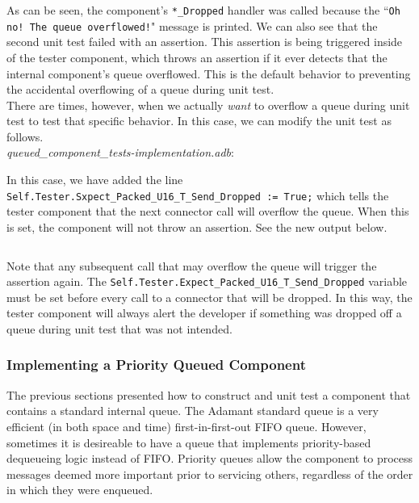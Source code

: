 As can be seen, the component's \texttt{*\_Dropped} handler was called because the ``\texttt{Oh no! The queue overflowed!}" message is printed. We can also see that the second unit test failed with an assertion. This assertion is being triggered inside of the tester component, which throws an assertion if it ever detects that the internal component's queue overflowed. This is the default behavior to preventing the accidental overflowing of a queue during unit test. \\

There are times, however, when we actually \textit{want} to overflow a queue during unit test to test that specific behavior. In this case, we can modify the unit test as follows. \\

\textit{queued\_component\_tests-implementation.adb}:

In this case, we have added the line \texttt{Self.Tester.Sxpect\_Packed\_U16\_T\_Send\_Dropped := True;} which tells the tester component that the next connector call will overflow the queue. When this is set, the component will not throw an assertion. See the new output below.

\vspace{5mm} %
\inputminted{text}{../example_architecture/queued_component/test2/output.txt}
\vspace{5mm} %

Note that any subsequent call that may overflow the queue will trigger the assertion again. The \texttt{Self.Tester.Expect\_Packed\_U16\_T\_Send\_Dropped} variable must be set before every call to a connector that will be dropped. In this way, the tester component will always alert the developer if something was dropped off a queue during unit test that was not intended. 

\subsubsection{Implementing a Priority Queued Component} \label{Implementing a Priority Queued Component}

The previous sections presented how to construct and unit test a component that contains a standard internal queue. The Adamant standard queue is a very efficient (in both space and time) first-in-first-out FIFO queue. However, sometimes it is desireable to have a queue that implements priority-based dequeueing logic instead of FIFO. Priority queues allow the component to process messages deemed more important prior to servicing others, regardless of the order in which they were enqueued. \\

